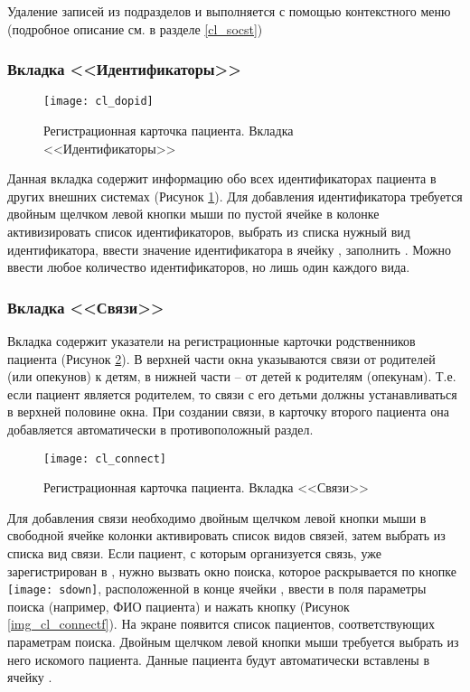 Удаление записей из подразделов  и  выполняется с помощью контекстного меню (подробное описание см. в разделе \ref{cl_socst})

\subsubsection{Вкладка <<Идентификаторы>>}

\begin{figure}[ht!]\centering
 \texttt{[image: cl\_dopid]}
 \caption{Регистрационная карточка пациента. Вкладка <<Идентификаторы>>}
 \label{img_cl_dopid}
\end{figure} 

Данная вкладка содержит информацию обо всех идентификаторах пациента в других внешних системах (Рисунок \ref{img_cl_dopid}). Для добавления идентификатора требуется двойным щелчком левой кнопки мыши по пустой ячейке в колонке  активизировать список идентификаторов, выбрать из списка нужный вид идентификатора, ввести значение идентификатора в ячейку , заполнить . Можно ввести любое количество идентификаторов, но лишь один каждого вида. 

\subsubsection{Вкладка <<Связи>>}

Вкладка  содержит указатели на регистрационные карточки родственников пациента (Рисунок \ref{img_cl_connect}). В верхней части окна указываются связи от родителей (или опекунов) к детям, в нижней части – от детей к родителям (опекунам). Т.е. если пациент является родителем, то связи с его детьми должны устанавливаться в верхней половине окна. При создании связи, в карточку второго пациента она добавляется автоматически в противоположный раздел.

\begin{figure}[ht!]\centering
 \texttt{[image: cl\_connect]}
 \caption{Регистрационная карточка пациента. Вкладка <<Связи>>}
 \label{img_cl_connect}
\end{figure} 

Для добавления связи необходимо двойным щелчком левой кнопки мыши в свободной ячейке колонки  активировать список видов связей, затем выбрать из списка вид связи. Если пациент, с которым организуется связь, уже зарегистрирован в \tmis, нужно вызвать окно поиска, которое раскрывается по кнопке \texttt{[image: sdown]}, расположенной в конце ячейки , ввести в поля параметры поиска (например, ФИО пациента) и нажать кнопку  (Рисунок \ref{img_cl_connectf}). На экране появится список пациентов, соответствующих параметрам поиска. Двойным щелчком левой кнопки мыши требуется выбрать из него искомого пациента. Данные пациента будут автоматически вставлены в ячейку .


